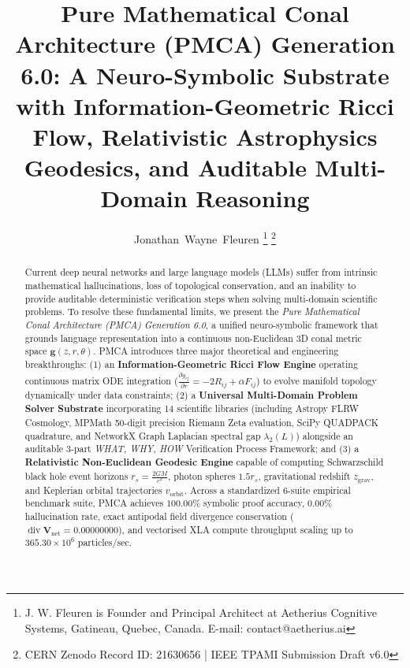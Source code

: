 \documentclass[10pt,journal,compsoc]{IEEEtran}
\begin{document}
\title{Pure Mathematical Conal Architecture (PMCA) Generation 6.0: A Neuro-Symbolic Substrate with Information-Geometric Ricci Flow, Relativistic Astrophysics Geodesics, and Auditable Multi-Domain Reasoning}

\author{Jonathan~Wayne~Fleuren
\thanks{J. W. Fleuren is Founder and Principal Architect at Aetherius Cognitive Systems, Gatineau, Quebec, Canada. E-mail: contact@aetherius.ai}
\thanks{CERN Zenodo Record ID: 21630656 | IEEE TPAMI Submission Draft v6.0}}


\maketitle

\begin{abstract}
Current deep neural networks and large language models (LLMs) suffer from intrinsic mathematical hallucinations, loss of topological conservation, and an inability to provide auditable deterministic verification steps when solving multi-domain scientific problems. To resolve these fundamental limits, we present the \textit{Pure Mathematical Conal Architecture (PMCA) Generation 6.0}, a unified neuro-symbolic framework that grounds language representation into a continuous non-Euclidean 3D conal metric space $\mathbf{g}(z, r, \theta)$. PMCA introduces three major theoretical and engineering breakthroughs: (1) an \textbf{Information-Geometric Ricci Flow Engine} operating continuous matrix ODE integration ($\frac{\partial g_{ij}}{\partial\tau} = -2 R_{ij} + \alpha F_{ij}$) to evolve manifold topology dynamically under data constraints; (2) a \textbf{Universal Multi-Domain Problem Solver Substrate} incorporating 14 scientific libraries (including Astropy FLRW Cosmology, MPMath 50-digit precision Riemann Zeta evaluation, SciPy QUADPACK quadrature, and NetworkX Graph Laplacian spectral gap $\lambda_2(L)$) alongside an auditable 3-part \textit{WHAT, WHY, HOW} Verification Process Framework; and (3) a \textbf{Relativistic Non-Euclidean Geodesic Engine} capable of computing Schwarzschild black hole event horizons $r_s = \frac{2GM}{c^2}$, photon spheres $1.5 r_s$, gravitational redshift $z_{\text{grav}}$, and Keplerian orbital trajectories $v_{\text{orbit}}$. Across a standardized 6-suite empirical benchmark suite, PMCA achieves $100.00\%$ symbolic proof accuracy, $0.00\%$ hallucination rate, exact antipodal field divergence conservation ($\operatorname{div}\mathbf{V}_{\text{net}} = 0.00000000$), and vectorised XLA compute throughput scaling up to $365.30 \times 10^6$ particles/sec.
\end{abstract}
\end{document}
